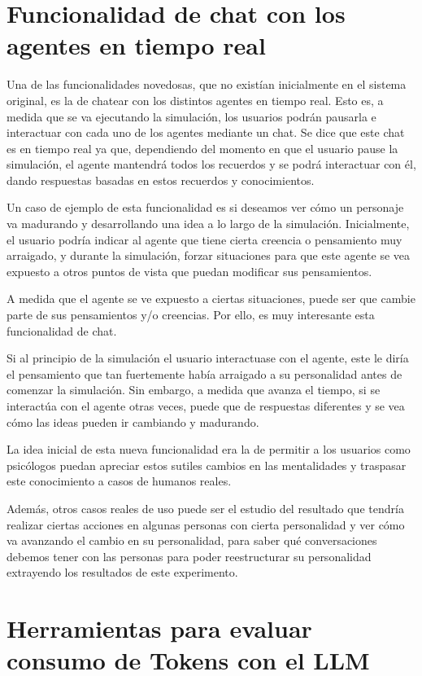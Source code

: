 \section{Funcionalidad de chat con los agentes en tiempo real}

Una de las funcionalidades novedosas, que no existían inicialmente en el sistema original, es la de chatear con los distintos agentes en tiempo real. Esto es, a medida que se va ejecutando la simulación, los usuarios podrán pausarla e interactuar con cada uno de los agentes mediante un chat. Se dice que este chat es en tiempo real ya que, dependiendo del momento en que el usuario pause la simulación, el agente mantendrá todos los recuerdos y se podrá interactuar con él, dando respuestas basadas en estos recuerdos y conocimientos.

Un caso de ejemplo de esta funcionalidad es si deseamos ver cómo un personaje va madurando y desarrollando una idea a lo largo de la simulación. Inicialmente, el usuario podría indicar al agente que tiene cierta creencia o pensamiento muy arraigado, y durante la simulación, forzar situaciones para que este agente se vea expuesto a otros puntos de vista que puedan modificar sus pensamientos.

A medida que el agente se ve expuesto a ciertas situaciones, puede ser que cambie parte de sus pensamientos y/o creencias. Por ello, es muy interesante esta funcionalidad de chat.

Si al principio de la simulación el usuario interactuase con el agente, este le diría el pensamiento que tan fuertemente había arraigado a su personalidad antes de comenzar la simulación. Sin embargo, a medida que avanza el tiempo, si se interactúa con el agente otras veces, puede que de respuestas diferentes y se vea cómo las ideas pueden ir cambiando y madurando.

La idea inicial de esta nueva funcionalidad era la de permitir a los usuarios como psicólogos puedan apreciar estos sutiles cambios en las mentalidades y traspasar este conocimiento a casos de humanos reales.

Además, otros casos reales de uso puede ser el estudio del resultado que tendría realizar ciertas acciones en algunas personas con cierta personalidad y ver cómo va avanzando el cambio en su personalidad, para saber qué conversaciones debemos tener con las personas para poder reestructurar su personalidad extrayendo los resultados de este experimento.

\section{Herramientas para evaluar consumo de Tokens con el LLM}

